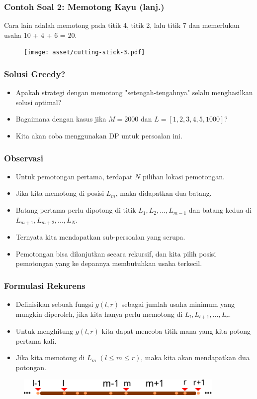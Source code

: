 \begin{frame}
\frametitle{Contoh Soal 2: Memotong Kayu (lanj.)}
Cara lain adalah memotong pada titik 4, titik 2, lalu titik 7 dan memerlukan usaha 10 + 4 + 6 = 20.
\begin{figure}
  \texttt{[image: asset/cutting-stick-3.pdf]}
\end{figure}
\end{frame}

\begin{frame}
\frametitle{Solusi Greedy?}
\begin{itemize}
  \item Apakah strategi \fGreedy dengan memotong "setengah-tengahnya" selalu menghasilkan solusi optimal?
  \item Bagaimana dengan kasus jika $M = 2000$ dan $L = [1, 2, 3, 4, 5, 1000]$?
  \item Kita akan coba menggunakan DP untuk persoalan ini.
\end{itemize}
\end{frame}

\begin{frame}
\frametitle{Observasi}
\begin{itemize}
  \item Untuk pemotongan pertama, terdapat $N$ pilihan lokasi pemotongan.
  \item Jika kita memotong di posisi $L_m$, maka didapatkan dua batang.
  \item Batang pertama perlu dipotong di titik $L_1, L_2, ..., L_{m-1}$ dan batang kedua di $L_{m+1}, L_{m+2}, ..., L_N$.
  \item Ternyata kita mendapatkan sub-persoalan yang serupa.
  \item Pemotongan bisa dilanjutkan secara rekursif, dan kita pilih posisi pemotongan yang ke depannya membutuhkan usaha terkecil.
\end{itemize}
\end{frame}

\begin{frame}
\frametitle{Formulasi Rekurens}
\begin{itemize}
  \item Definisikan sebuah fungsi $g(l,r)$ sebagai jumlah usaha minimum yang mungkin diperoleh, jika kita hanya perlu memotong di $L_{l}, L_{l+1}, ..., L_{r}$.
  \item Untuk menghitung $g(l,r)$ kita dapat mencoba titik mana yang kita potong pertama kali.
  \item Jika kita memotong di $L_m$ $(l \leq m \leq r)$, maka kita akan mendapatkan dua potongan.
\end{itemize}
\begin{figure}
  \includegraphics[width=10cm]{asset/cutting-stick-4.pdf}
\end{figure}
\end{frame}

